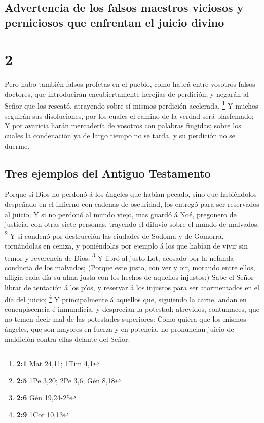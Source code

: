 \hypertarget{advertencia-de-los-falsos-maestros-viciosos-y-perniciosos-que-enfrentan-el-juicio-divino}{%
\subsection{Advertencia de los falsos maestros viciosos y perniciosos
que enfrentan el juicio
divino}\label{advertencia-de-los-falsos-maestros-viciosos-y-perniciosos-que-enfrentan-el-juicio-divino}}

\hypertarget{section-1}{%
\section{2}\label{section-1}}

 Pero hubo también falsos profetas en el pueblo, como
habrá entre vosotros falsos doctores, que introducirán encubiertamente
herejías de perdición, y negarán al Señor que los rescató, atrayendo
sobre sí mismos perdición acelerada. \footnote{\textbf{2:1} Mat 24,11;
  1Tim 4,1}  Y muchos seguirán sus disoluciones, por los
cuales el camino de la verdad será blasfemado;  Y por
avaricia harán mercadería de vosotros con palabras fingidas; sobre los
cuales la condenación ya de largo tiempo no se tarda, y su perdición no
se duerme.

\hypertarget{tres-ejemplos-del-antiguo-testamento}{%
\subsection{Tres ejemplos del Antiguo
Testamento}\label{tres-ejemplos-del-antiguo-testamento}}

 Porque si Dios no perdonó á los ángeles que habían
pecado, sino que habiéndolos despeñado en el infierno con cadenas de
oscuridad, los entregó para ser reservados al juicio;  Y
si no perdonó al mundo viejo, mas guardó á Noé, pregonero de justicia,
con otras siete personas, trayendo el diluvio sobre el mundo de
malvados; \footnote{\textbf{2:5} 1Pe 3,20; 2Pe 3,6; Gén 8,18}
 Y si condenó por destrucción las ciudades de Sodoma y de
Gomorra, tornándolas en ceniza, y poniéndolas por ejemplo á los que
habían de vivir sin temor y reverencia de Dios; \footnote{\textbf{2:6}
  Gén 19,24-25}  Y libró al justo Lot, acosado por la
nefanda conducta de los malvados;  (Porque este justo, con
ver y oir, morando entre ellos, afligía cada día su alma justa con los
hechos de aquellos injustos;)  Sabe el Señor librar de
tentación á los píos, y reservar á los injustos para ser atormentados en
el día del juicio; \footnote{\textbf{2:9} 1Cor 10,13}  Y
principalmente á aquellos que, siguiendo la carne, andan en
concupiscencia é inmundicia, y desprecian la potestad; atrevidos,
contumaces, que no temen decir mal de las potestades superiores:
 Como quiera que los mismos ángeles, que son mayores en
fuerza y en potencia, no pronuncian juicio de maldición contra ellas
delante del Señor.

